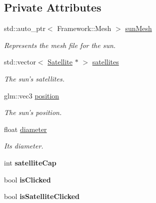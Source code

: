 \subsection*{Private Attributes}
\begin{DoxyCompactItemize}
\item 
\hypertarget{class_sun_a1aa72a3e0baeabd76642c48b969abf99}{std\-::auto\-\_\-ptr$<$ Framework\-::\-Mesh $>$ \hyperlink{class_sun_a1aa72a3e0baeabd76642c48b969abf99}{sun\-Mesh}}\label{class_sun_a1aa72a3e0baeabd76642c48b969abf99}

\begin{DoxyCompactList}\small\item\em Represents the mesh file for the sun. \end{DoxyCompactList}\item 
\hypertarget{class_sun_a0e5857745c6be53c3e2a6e518ff291d6}{std\-::vector$<$ \hyperlink{class_satellite}{Satellite} $\ast$ $>$ \hyperlink{class_sun_a0e5857745c6be53c3e2a6e518ff291d6}{satellites}}\label{class_sun_a0e5857745c6be53c3e2a6e518ff291d6}

\begin{DoxyCompactList}\small\item\em The sun's satellites. \end{DoxyCompactList}\item 
\hypertarget{class_sun_acab91a34acacee79bb743089738da5cc}{glm\-::vec3 \hyperlink{class_sun_acab91a34acacee79bb743089738da5cc}{position}}\label{class_sun_acab91a34acacee79bb743089738da5cc}

\begin{DoxyCompactList}\small\item\em The sun's position. \end{DoxyCompactList}\item 
\hypertarget{class_sun_ac35fc9ebc427d9c8c9fd3ee3a12fce82}{float \hyperlink{class_sun_ac35fc9ebc427d9c8c9fd3ee3a12fce82}{diameter}}\label{class_sun_ac35fc9ebc427d9c8c9fd3ee3a12fce82}

\begin{DoxyCompactList}\small\item\em Its {\itshape diameter}. \end{DoxyCompactList}\item 
\hypertarget{class_sun_a1c33d5e99fc2c6d51a43043504ecb9a4}{int {\bfseries satellite\-Cap}}\label{class_sun_a1c33d5e99fc2c6d51a43043504ecb9a4}

\item 
\hypertarget{class_sun_aa7d9c22a62eed3d761394d0acd87c5a3}{bool {\bfseries is\-Clicked}}\label{class_sun_aa7d9c22a62eed3d761394d0acd87c5a3}

\item 
\hypertarget{class_sun_a12b44931417d0d4329731cfd8a00ced9}{bool {\bfseries is\-Satellite\-Clicked}}\label{class_sun_a12b44931417d0d4329731cfd8a00ced9}

\end{DoxyCompactItemize}


